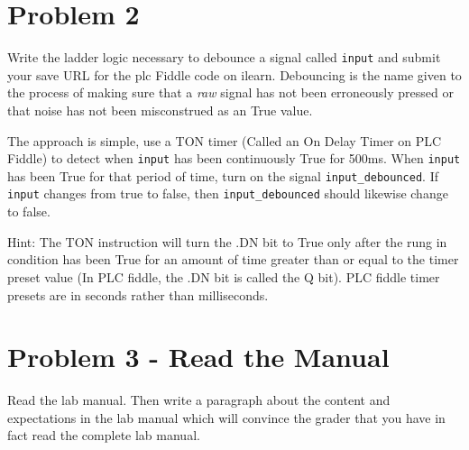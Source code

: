 \section{Problem 2}

Write the ladder logic necessary to debounce a signal called \verb|input| and submit your save URL for the plc Fiddle code on ilearn. Debouncing is the name given to the process of making sure that a \textit{raw} signal has not been erroneously pressed or that noise has not been misconstrued as an True value. 

The approach is simple, use a TON timer (Called an On Delay Timer on PLC Fiddle) to detect when \verb|input| has been continuously True for 500ms.  When \verb|input| has been True for that period of time, turn on the signal \verb|input_debounced|. If \verb|input| changes from true to false, then \verb|input_debounced| should likewise change to false. 

Hint: The TON instruction will turn the .DN bit to True only after the rung in condition has been True for an amount of time greater than or equal to the timer preset value (In PLC fiddle, the .DN bit is called the Q bit). PLC fiddle timer presets are in seconds rather than milliseconds.


\section{Problem 3 - Read the Manual}

Read the lab manual. Then write a paragraph about the content and expectations in the lab manual which will convince the grader that you have in fact read the complete lab manual.